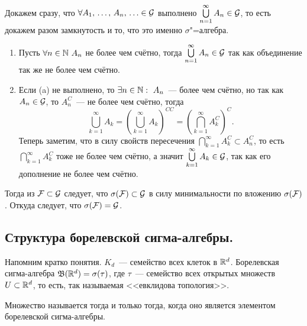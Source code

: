\begin{solution}
\begin{enumerate}[label=\arabic*\degree.]
              Докажем сразу, что $\forall A_1,\,\ldots,\, A_n,\, \ldots\in\mathcal{G}$ выполнено $\bigcup\limits_{n=1}^{\infty}A_n\in\mathcal{G}$,
              то есть докажем разом замкнутость и то, что это именно $\sigma$"=алгебра.
              \begin{enumerate}[label=(a)]
                  \item Пусть $\forall n\in\mathbb{N}\ A_n$ не более чем счётно, тогда $\bigcup\limits_{n=1}^{\infty}A_n\in\mathcal{G}$ так как
                        объединение так же не более чем счётно.
                  \item Если (a) не выполнено, то $\exists n\in\mathbb{N}:\ A_n$~--- более чем счётно, но так как $A_n\in\mathcal{G}$, то
                        $A_n^C$~--- не более чем счётно, тогда
                        \[
                            \bigcup_{k=1}^{\infty}A_k=\left(\bigcup_{k=1}^{\infty}A_k\right)^{CC}=
                            \left(\bigcap_{k=1}^{\infty}A_k^C\right)^C.
                        \]
                        Теперь заметим, что в силу свойств пересечения $\bigcap\limits_{k=1}^{\infty}A_k^C\subset A_n^C$, то есть
                        $\bigcap\limits_{k=1}^{\infty}A_k^C$ тоже не более чем счётно, а значит $\bigcup\limits_{k=1}^{\infty}A_k\in\mathcal{G}$,
                        так как его дополнение не более чем счётно.
              \end{enumerate}
    \end{enumerate}

    Тогда из $\mathcal{F} \subset \mathcal{G}$ следует, что $\sigma(\mathcal{F} )\subset\mathcal{G}$
    в силу минимальности по вложению $\sigma(\mathcal{F} )$. Откуда следует, что $\sigma(\mathcal{F} )=\mathcal{G}$.

\end{solution}

\subsection{Структура борелевской сигма-алгебры.}

Напомним кратко понятия. $K_d$~--- семейство всех клеток в $\mathbb{R}^d$.
Борелевская сигма-алгебра $\mathfrak{B}(\mathbb{R}^d)=\sigma(\tau)$, где $\tau$~--- семейство всех открытых
множеств $U\subset  \mathbb{R}^d$, то есть, так называемая <<евклидова топология>>.

\begin{definition}
    Множество называется  тогда и только тогда, когда оно является элементом
    борелевской сигма-алгебры.
\end{definition}

